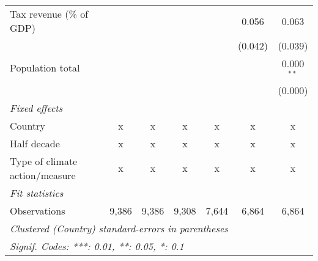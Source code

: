 \begin{tabular}{lcccccc}
   Tax revenue (\% of GDP)                           &         &         &               &               & 0.056        & 0.063\\   
                                                     &         &         &               &               & (0.042)      & (0.039)\\   
   Population total                                  &         &         &               &               &              & 0.000$^{**}$\\   
                                                     &         &         &               &               &              & (0.000)\\   
   \emph{Fixed effects}\\
   Country                                           & x       & x       & x             & x             & x            & x\\  
   Half decade                                       & x       & x       & x             & x             & x            & x\\  
   Type of climate action/measure                    & x       & x       & x             & x             & x            & x\\  
   \midrule \emph{Fit statistics}\\
   Observations                                      & 9,386   & 9,386   & 9,308         & 7,644         & 6,864        & 6,864\\  
   \midrule
   \multicolumn{7}{l}{\emph{Clustered (Country) standard-errors in parentheses}}\\
   \multicolumn{7}{l}{\emph{Signif. Codes: ***: 0.01, **: 0.05, *: 0.1}}\\
\end{tabular}
\par\endgroup


